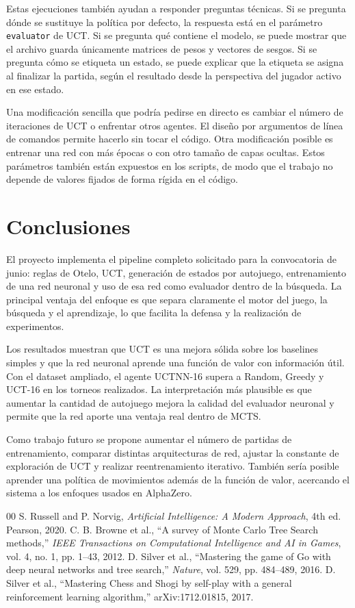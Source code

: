 \documentclass[conference,a4paper]{IEEEtran}
\begin{document}
Estas ejecuciones también ayudan a responder preguntas técnicas. Si se pregunta
dónde se sustituye la política por defecto, la respuesta está en el parámetro
\texttt{evaluator} de UCT. Si se pregunta qué contiene el modelo, se puede
mostrar que el archivo guarda únicamente matrices de pesos y vectores de sesgos.
Si se pregunta cómo se etiqueta un estado, se puede explicar que la etiqueta se
asigna al finalizar la partida, según el resultado desde la perspectiva del
jugador activo en ese estado.

Una modificación sencilla que podría pedirse en directo es cambiar el número de
iteraciones de UCT o enfrentar otros agentes. El diseño por argumentos de línea
de comandos permite hacerlo sin tocar el código. Otra modificación posible es
entrenar una red con más épocas o con otro tamaño de capas ocultas. Estos
parámetros también están expuestos en los scripts, de modo que el trabajo no
depende de valores fijados de forma rígida en el código.

\section{Conclusiones}

El proyecto implementa el pipeline completo solicitado para la convocatoria de
junio: reglas de Otelo, UCT, generación de estados por autojuego, entrenamiento
de una red neuronal y uso de esa red como evaluador dentro de la búsqueda. La
principal ventaja del enfoque es que separa claramente el motor del juego, la
búsqueda y el aprendizaje, lo que facilita la defensa y la realización de
experimentos.

Los resultados muestran que UCT es una mejora sólida sobre los baselines simples
y que la red neuronal aprende una función de valor con información útil. Con el
dataset ampliado, el agente UCTNN-16 supera a Random, Greedy y UCT-16 en los
torneos realizados. La interpretación más plausible es que aumentar la cantidad
de autojuego mejora la calidad del evaluador neuronal y permite que la red aporte
una ventaja real dentro de MCTS.

Como trabajo futuro se propone aumentar el número de partidas de entrenamiento,
comparar distintas arquitecturas de red, ajustar la constante de exploración de
UCT y realizar reentrenamiento iterativo. También sería posible aprender una
política de movimientos además de la función de valor, acercando el sistema a
los enfoques usados en AlphaZero.

\begin{thebibliography}{00}
 S. Russell and P. Norvig, \emph{Artificial Intelligence:
A Modern Approach}, 4th ed. Pearson, 2020.
 C. B. Browne et al., ``A survey of Monte Carlo Tree Search
methods,'' \emph{IEEE Transactions on Computational Intelligence and AI in
Games}, vol. 4, no. 1, pp. 1--43, 2012.
 D. Silver et al., ``Mastering the game of Go with deep
neural networks and tree search,'' \emph{Nature}, vol. 529, pp. 484--489, 2016.
 D. Silver et al., ``Mastering Chess and Shogi by self-play
with a general reinforcement learning algorithm,'' arXiv:1712.01815, 2017.
\end{thebibliography}
\end{document}
